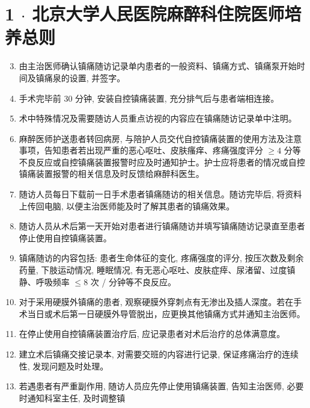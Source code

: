 \documentclass[10pt]{article}
\begin{document}
\section*{1 $\cdot$ 北京大学人民医院麻醉科住院医师培养总则}
\begin{enumerate}
  \setcounter{enumi}{2}
  \item 由主治医师确认镇痛随访记录单内患者的一般资料、镇痛方式、镇痛泵开始时间及镇痛泉的设置, 并签字。

  \item 手术完毕前 30 分钟, 安装自控镇痛装置, 充分排气后与患者端相连接。

  \item 术中特殊情况及需要随访人员重点访视的内容应在镇痛随访记录单中注明。

  \item 麻醉医师护送患者转回病房, 与陪护人员交代自控镇痛装置的使用方法及注意事项，告知患者若出现严重的恶心呕吐、皮肤瘙痒、疼痛强度评分 $\geqslant 4$ 分等不良反应或自控镇痛装置报警时应及时通知护士。护士应将患者的情况或自控镇痛装置报警的相关信息及时反馈给麻醉科医生。

  \item 随访人员每日下载前一日手术患者镇痛随访的相关信息。随访完毕后, 将资料上传回电脑, 以便主治医师能及时了解其患者的镇痛效果。

  \item 随访人员从术后第一天开始对患者进行镇痛随访并填写镇痛随访记录直至患者停止使用自控镇痛装置。

  \item 镇痛随访的内容包括: 患者生命体征的变化, 疼痛强度的评分, 按压次数及剩余药量, 下肢运动情况, 睡眠情况, 有无恶心呕吐、皮肤症㾕、尿渚留、过度镇静、呼吸频率 $\leqslant 8$ 次 / 分钟等不良反应。

  \item 对于采用硬膜外镇痛的患者, 观察硬膜外穿刺点有无渗出及插人深度。若在手术当日或术后第一日硬膜外导管脱出，应更换其他镇痛方式并通知主治医师。

  \item 在停止使用自控镇痛装置治疗后, 应记录患者对术后治疗的总体满意度。

  \item 建立术后镇痛交接记录本, 对需要交班的内容进行记录, 保证疼痛治疗的连续性, 发现问题及时处理。

  \item 若遇患者有严重副作用, 随访人员应先停止使用镇痛装置, 告知主治医师, 必要时通知科室主任, 及时调整镇

\end{enumerate}
\end{document}

